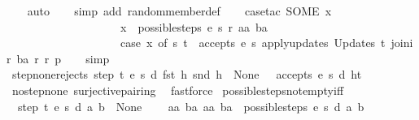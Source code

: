 \begin{isabellebody}
\ \ \isamarkupfalse%
\ auto{\isacharbrackleft}{}{\isacharbrackright}\isanewline
\ \ \isamarkupfalse%
\ {\isacharparenleft}simp\ add{\isacharcolon}\ random{\isacharunderscore}member{\isacharunderscore}def{\isacharparenright}\isanewline
\ \ \isamarkupfalse%
\ {\isacharparenleft}case{\isacharunderscore}tac\ {\isachardoublequoteopen}SOME\ x{\isachardot}\isanewline
\ \ \ \ \ \ \ \ \ \ \ \ \ \ \ \ \ \ \ \ x\ {\isacharbar}{\isasymin}{\isacharbar}\ possible{\isacharunderscore}steps\ e\ s\ r\ aa\ ba\ {\isasymand}\isanewline
\ \ \ \ \ \ \ \ \ \ \ \ \ \ \ \ \ \ \ \ {\isacharparenleft}case\ x\ of\ {\isacharparenleft}s{\isacharprime}{\isacharcomma}\ t{\isacharparenright}\ {\isasymRightarrow}\ accepts\ e\ s{\isacharprime}\ {\isacharparenleft}apply{\isacharunderscore}updates\ {\isacharparenleft}Updates\ t{\isacharparenright}\ {\isacharparenleft}join{\isacharunderscore}ir\ ba\ r{\isacharparenright}\ r{\isacharparenright}\ p{\isacharparenright}{\isachardoublequoteclose}{\isacharparenright}\isanewline
\ \ \isamarkupfalse%
\ simp%
\endisatagproof
{\isafoldproof}%
%
\isadelimproof
\isanewline
%
\endisadelimproof
\isanewline
{}\isamarkupfalse%
\ step{\isacharunderscore}none{\isacharunderscore}rejects{\isacharcolon}\ {\isachardoublequoteopen}{\isacharparenleft}{\isacharparenleft}step\ t\ e\ s\ d\ {\isacharparenleft}fst\ h{\isacharparenright}\ {\isacharparenleft}snd\ h{\isacharparenright}{\isacharparenright}\ {\isacharequal}\ None{\isacharparenright}\ {\isasymLongrightarrow}\ {\isasymnot}\ {\isacharparenleft}accepts\ e\ s\ d\ {\isacharparenleft}h{\isacharhash}t{\isacharparenright}{\isacharparenright}{\isachardoublequoteclose}\isanewline
%
\isadelimproof
\ \ %
\endisadelimproof
%
\isatagproof
{}\isamarkupfalse%
\ no{\isacharunderscore}step{\isacharunderscore}none\ surjective{\isacharunderscore}pairing\ \isamarkupfalse%
\ fastforce%
\endisatagproof
{\isafoldproof}%
%
\isadelimproof
\isanewline
%
\endisadelimproof
\isanewline
{}\isamarkupfalse%
\ possible{\isacharunderscore}steps{\isacharunderscore}not{\isacharunderscore}empty{\isacharunderscore}iff{\isacharcolon}\ \isanewline
\ \ {\isachardoublequoteopen}step\ t\ e\ s\ d\ a\ b\ {\isasymnoteq}\ None\ {\isasymLongrightarrow}\isanewline
\ \ \ {\isasymexists}aa\ ba{\isachardot}\ {\isacharparenleft}aa{\isacharcomma}\ ba{\isacharparenright}\ {\isacharbar}{\isasymin}{\isacharbar}\ possible{\isacharunderscore}steps\ e\ s\ d\ a\ b{\isachardoublequoteclose}\isanewline
%
\isadelimproof
\ \ %
\endisadelimproof

\end{isabellebody}
